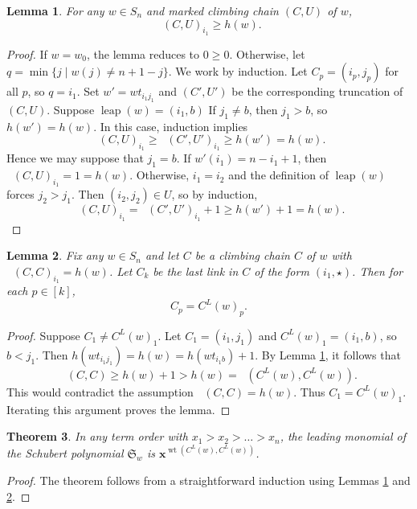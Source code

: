\documentclass[11pt]{amsart}
\newtheorem{theorem}{Theorem}[section]
\newtheorem{lemma}[theorem]{Lemma}
\theoremstyle{definition}
\theoremstyle{named}
\newcommand{\CL}{C^L}
\DeclareMathOperator{\leap}{\mathrm{leap}}
\DeclareMathOperator{\wt}{\mathrm{wt}}
\DeclareMathOperator{\dwt}{\overline{\mathrm{wt}}}
\begin{document}
	\begin{lemma}
		\label{lem:hwminimal}
		For any $w\in S_n$ and marked climbing chain $(C,U)$ of $w$, 
		\[\dwt(C,U)_{i_1}\geq h(w). \]
	\end{lemma}
	\begin{proof}
		If $w=w_0$, the lemma reduces to $0\geq 0$. Otherwise, let $q=\min\{j\mid w(j)\neq n+1-j\}$. We work by induction. Let $C_p=(i_p,j_p)$ for all $p$, so $q=i_1$. Set $w'=wt_{i_1j_1}$ and $(C',U')$ be the corresponding truncation of $(C,U)$. Suppose $\leap(w)=(i_1,b)$ If $j_1\neq b$, then $j_1>b$, so $h(w')=h(w)$. In this case, induction implies
		\[\dwt(C,U)_{i_1} \geq \dwt(C',U')_{i_1} \geq h(w')=h(w). \] 
		Hence we may suppose that $j_1=b$. If $w'(i_1)=n-i_1+1$, then $\dwt(C,U)_{i_1}=1=h(w)$. Otherwise, $i_1=i_2$ and the definition of $\leap(w)$ forces $j_2>j_1$. Then $(i_2,j_2)\in U$, so by induction,
		\[\dwt(C,U)_{i_1} = \dwt(C',U')_{i_1}+1 \geq h(w')+1 = h(w). \]
	\end{proof}

	\begin{lemma}
		\label{lem:hwminimalsamestart}
		Fix any $w\in S_n$ and let $C$ be a climbing chain $C$ of $w$ with $\dwt(C,C)_{i_1}=h(w)$. Let $C_k$ be the last link in $C$ of the form $(i_1,\star)$. Then for each $p\in[k]$,
		\[C_p=\CL(w)_p.\]
	\end{lemma}
	\begin{proof}
		Suppose $C_1\neq\CL(w)_1$. Let $C_1=(i_1,j_1)$ and $\CL(w)_1=(i_1,b)$, so $b<j_1$. Then $h(wt_{i_1j_1}) = h(w) = h(wt_{i_1b})+1$. By Lemma \ref{lem:hwminimal}, it follows that
		\[\dwt(C,C)\geq h(w)+1>h(w)=\dwt(\CL(w),\CL(w)).\]
		This would contradict the assumption $\dwt(C,C)= h(w)$. Thus $C_1=\CL(w)_1$. Iterating this argument proves the lemma.
	\end{proof}

	\begin{theorem}
		\label{thm:leapingleading}
		In any term order with $x_1>x_2>\dots>x_n$, the leading monomial of the Schubert polynomial $\mathfrak{S}_w$ is $\bm{x}^{\wt(\CL(w),\CL(w))}$.
	\end{theorem}
	\begin{proof}
		The theorem follows from a straightforward induction using Lemmas \ref{lem:hwminimal} and \ref{lem:hwminimalsamestart}.
	\end{proof}
\end{document}
